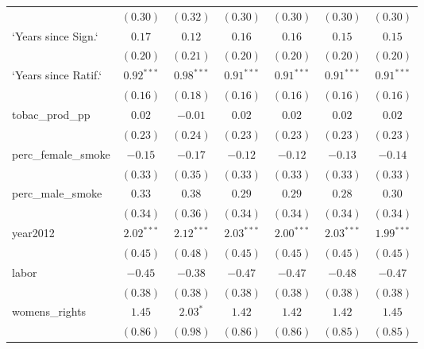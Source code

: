 \begin{table}[!h]
\begin{center}
\begin{tabular}{l c c c c c c }
                        & $(0.30)$     & $(0.32)$     & $(0.30)$     & $(0.30)$     & $(0.30)$     & $(0.30)$     \\
`Years since Sign.`     & $0.17$       & $0.12$       & $0.16$       & $0.16$       & $0.15$       & $0.15$       \\
                        & $(0.20)$     & $(0.21)$     & $(0.20)$     & $(0.20)$     & $(0.20)$     & $(0.20)$     \\
`Years since Ratif.`    & $0.92^{***}$ & $0.98^{***}$ & $0.91^{***}$ & $0.91^{***}$ & $0.91^{***}$ & $0.91^{***}$ \\
                        & $(0.16)$     & $(0.18)$     & $(0.16)$     & $(0.16)$     & $(0.16)$     & $(0.16)$     \\
tobac\_prod\_pp         & $0.02$       & $-0.01$      & $0.02$       & $0.02$       & $0.02$       & $0.02$       \\
                        & $(0.23)$     & $(0.24)$     & $(0.23)$     & $(0.23)$     & $(0.23)$     & $(0.23)$     \\
perc\_female\_smoke     & $-0.15$      & $-0.17$      & $-0.12$      & $-0.12$      & $-0.13$      & $-0.14$      \\
                        & $(0.33)$     & $(0.35)$     & $(0.33)$     & $(0.33)$     & $(0.33)$     & $(0.33)$     \\
perc\_male\_smoke       & $0.33$       & $0.38$       & $0.29$       & $0.29$       & $0.28$       & $0.30$       \\
                        & $(0.34)$     & $(0.36)$     & $(0.34)$     & $(0.34)$     & $(0.34)$     & $(0.34)$     \\
year2012                & $2.02^{***}$ & $2.12^{***}$ & $2.03^{***}$ & $2.00^{***}$ & $2.03^{***}$ & $1.99^{***}$ \\
                        & $(0.45)$     & $(0.48)$     & $(0.45)$     & $(0.45)$     & $(0.45)$     & $(0.45)$     \\
labor                   & $-0.45$      & $-0.38$      & $-0.47$      & $-0.47$      & $-0.48$      & $-0.47$      \\
                        & $(0.38)$     & $(0.38)$     & $(0.38)$     & $(0.38)$     & $(0.38)$     & $(0.38)$     \\
womens\_rights          & $1.45$       & $2.03^{*}$   & $1.42$       & $1.42$       & $1.42$       & $1.45$       \\
                        & $(0.86)$     & $(0.98)$     & $(0.86)$     & $(0.86)$     & $(0.85)$     & $(0.85)$     \\

\end{tabular}
\end{center}
\end{table}

